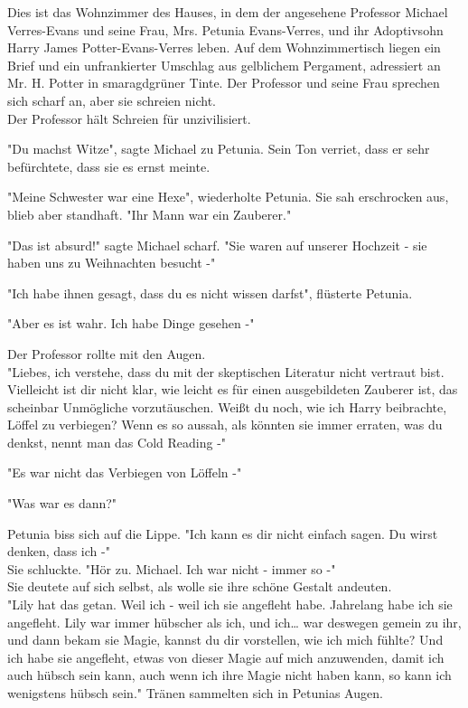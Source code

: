{Dies ist das Wohnzimmer des Hauses, in dem der angesehene Professor Michael Verres-Evans und seine Frau, Mrs. Petunia Evans-Verres, und ihr Adoptivsohn Harry James Potter-Evans-Verres leben. Auf dem Wohnzimmertisch liegen ein Brief und ein unfrankierter Umschlag aus gelblichem Pergament, adressiert an Mr. H. Potter in smaragdgrüner Tinte. Der Professor und seine Frau sprechen sich scharf an, aber sie schreien nicht.\\ Der Professor hält Schreien für unzivilisiert.

"Du machst Witze", sagte Michael zu Petunia. Sein Ton verriet, dass er sehr befürchtete, dass sie es ernst meinte.

"Meine Schwester war eine Hexe", wiederholte Petunia. Sie sah erschrocken aus, blieb aber standhaft. "Ihr Mann war ein Zauberer."

"Das ist absurd!" sagte Michael scharf. "Sie waren auf unserer Hochzeit - sie haben uns zu Weihnachten besucht -"

"Ich habe ihnen gesagt, dass du es nicht wissen darfst", flüsterte Petunia.

"Aber es ist wahr. Ich habe Dinge gesehen -"

Der Professor rollte mit den Augen.\\ "Liebes, ich verstehe, dass du mit der skeptischen Literatur nicht vertraut bist.\\ Vielleicht ist dir nicht klar, wie leicht es für einen ausgebildeten Zauberer ist, das scheinbar Unmögliche vorzutäuschen. Weißt du noch, wie ich Harry beibrachte, Löffel zu verbiegen? Wenn es so aussah, als könnten sie immer erraten, was du denkst, nennt man das Cold Reading -"

"Es war nicht das Verbiegen von Löffeln -"

"Was war es dann?"

Petunia biss sich auf die Lippe. "Ich kann es dir nicht einfach sagen. Du wirst denken, dass ich -"\\ Sie schluckte. "Hör zu. Michael. Ich war nicht - immer so -"\\ Sie deutete auf sich selbst, als wolle sie ihre schöne Gestalt andeuten.\\ "Lily hat das getan. Weil ich - weil ich sie angefleht habe. Jahrelang habe ich sie angefleht. Lily war immer hübscher als ich, und ich… war deswegen gemein zu ihr, und dann bekam sie Magie, kannst du dir vorstellen, wie ich mich fühlte? Und ich habe sie angefleht, etwas von dieser Magie auf mich anzuwenden, damit ich auch hübsch sein kann, auch wenn ich ihre Magie nicht haben kann, so kann ich wenigstens hübsch sein." Tränen sammelten sich in Petunias Augen.

}
